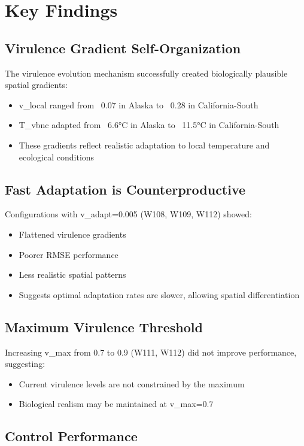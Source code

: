 \documentclass[11pt,a4paper]{article}
\begin{document}
\section{Key Findings}

\subsection{Virulence Gradient Self-Organization}

The virulence evolution mechanism successfully created biologically plausible spatial gradients:
\begin{itemize}
\item v\_local ranged from ~0.07 in Alaska to ~0.28 in California-South
\item T\_vbnc adapted from ~6.6°C in Alaska to ~11.5°C in California-South
\item These gradients reflect realistic adaptation to local temperature and ecological conditions
\end{itemize}

\subsection{Fast Adaptation is Counterproductive}

Configurations with v\_adapt=0.005 (W108, W109, W112) showed:
\begin{itemize}
\item Flattened virulence gradients
\item Poorer RMSE performance
\item Less realistic spatial patterns
\item Suggests optimal adaptation rates are slower, allowing spatial differentiation
\end{itemize}

\subsection{Maximum Virulence Threshold}

Increasing v\_max from 0.7 to 0.9 (W111, W112) did not improve performance, suggesting:
\begin{itemize}
\item Current virulence levels are not constrained by the maximum
\item Biological realism may be maintained at v\_max=0.7
\end{itemize}

\subsection{Control Performance}
\end{document}
